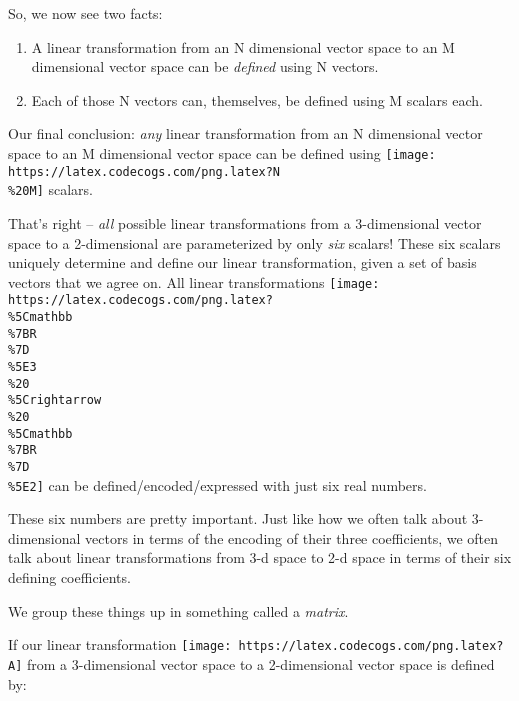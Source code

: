 \documentclass[]{article}
\begin{document}
So, we now see two facts:

\begin{enumerate}
\def\labelenumi{\arabic{enumi}.}
\tightlist
\item
  A linear transformation from an N dimensional vector space to an M dimensional
  vector space can be \emph{defined} using N vectors.
\item
  Each of those N vectors can, themselves, be defined using M scalars each.
\end{enumerate}

Our final conclusion: \emph{any} linear transformation from an N dimensional
vector space to an M dimensional vector space can be defined using
\texttt{[image: https://latex.codecogs.com/png.latex?N\\\%20M]} scalars.

That's right -- \emph{all} possible linear transformations from a 3-dimensional
vector space to a 2-dimensional are parameterized by only \emph{six} scalars!
These six scalars uniquely determine and define our linear transformation, given
a set of basis vectors that we agree on. All linear transformations
\texttt{[image: https://latex.codecogs.com/png.latex?\\\%5Cmathbb\\\%7BR\\\%7D\\\%5E3\\\%20\\\%5Crightarrow\\\%20\\\%5Cmathbb\\\%7BR\\\%7D\\\%5E2]}
can be defined/encoded/expressed with just six real numbers.

These six numbers are pretty important. Just like how we often talk about
3-dimensional vectors in terms of the encoding of their three coefficients, we
often talk about linear transformations from 3-d space to 2-d space in terms of
their six defining coefficients.

We group these things up in something called a \emph{matrix}.

If our linear transformation
\texttt{[image: https://latex.codecogs.com/png.latex?A]} from a 3-dimensional
vector space to a 2-dimensional vector space is defined by:
\end{document}
